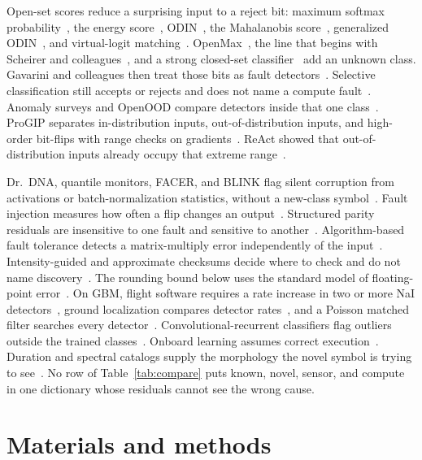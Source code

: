 \documentclass{ieeeaccess}
\begin{document}
Open-set scores reduce a surprising input to a reject bit: maximum softmax probability~\cite{hendrycks2017}, the energy score~\cite{liu2020}, ODIN~\cite{liang2018}, the Mahalanobis score~\cite{lee2018}, generalized ODIN~\cite{hsu2020}, and virtual-logit matching~\cite{wang2022}. OpenMax~\cite{bendale2016}, the line that begins with Scheirer and colleagues~\cite{scheirer2013,geng2021}, and a strong closed-set classifier~\cite{vaze2022} add an unknown class. Gavarini and colleagues then treat those bits as fault detectors~\cite{gavarini2022}. Selective classification still accepts or rejects and does not name a compute fault~\cite{sirc2022,narasimhan2024}. Anomaly surveys and OpenOOD compare detectors inside that one class~\cite{ruff2021,yang2022}. ProGIP separates in-distribution inputs, out-of-distribution inputs, and high-order bit-flips with range checks on gradients~\cite{progip2025}. ReAct showed that out-of-distribution inputs already occupy that extreme range~\cite{react2021}.

Dr.~DNA, quantile monitors, FACER, and BLINK flag silent corruption from activations or batch-normalization statistics, without a new-class symbol~\cite{drdna2024,geissler2023,schorn2020,blink2026}. Fault injection measures how often a flip changes an output~\cite{li2017,reagen2018,pytorchfi2020}. Structured parity residuals are insensitive to one fault and sensitive to another~\cite{gertler1990,venkatasubramanian2003,isermann2005,chen1999}. Algorithm-based fault tolerance detects a matrix-multiply error independently of the input~\cite{huang1984,zhao2021}. Intensity-guided and approximate checksums decide where to check and do not name discovery~\cite{kosaian2021,approxabft2023}. The rounding bound below uses the standard model of floating-point error~\cite{higham2002,ieee754}. On GBM, flight software requires a rate increase in two or more NaI detectors~\cite{meegan2009,paciesas2012}, ground localization compares detector rates~\cite{goldstein2020,connaughton2015}, and a Poisson matched filter searches every detector~\cite{perera2025}. Convolutional-recurrent classifiers flag outliers outside the trained classes~\cite{john2025}. Onboard learning assumes correct execution~\cite{bulgarelli2025}. Duration and spectral catalogs supply the morphology the novel symbol is trying to see~\cite{kouveliotou1993,poolakkil2021,vonkienlin2020}. No row of Table~\ref{tab:compare} puts known, novel, sensor, and compute in one dictionary whose residuals cannot see the wrong cause.

\section{Materials and methods}
\end{document}
